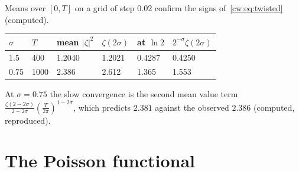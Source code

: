 Means over $[0,T]$ on a grid of step $0.02$ confirm the signs of~\eqref{cw:eq:twisted} (computed).
\begin{center}
\small
\begin{tabular}{llllll}
\toprule
$\sigma$ & $T$ & mean $|\zeta|^2$ & $\zeta(2\sigma)$ & at $\ln2$ & $2^{-\sigma}\zeta(2\sigma)$\\
\midrule
1.5 & 400 & 1.2040 & 1.2021 & 0.4287 & 0.4250\\
0.75 & 1000 & 2.386 & 2.612 & 1.365 & 1.553\\
\bottomrule
\end{tabular}
\end{center}
At $\sigma=0.75$ the slow convergence is the second mean value term $\frac{\zeta(2-2\sigma)}{2-2\sigma}(\frac T{2\pi})^{1-2\sigma}$, which predicts $2.381$ against the observed $2.386$ (computed, reproduced).

\section{The Poisson functional}\label{cw:sec:bsy}

